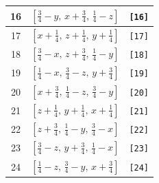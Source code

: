 \documentclass[fleqn,8pt]{jsarticle}
\begin{document}
\begin{longtable}{ccc}
16 & $\left[ \frac{3}{4} - y,\, x + \frac{3}{4},\, \frac{1}{4} - z \right]$ & {\tt [16]} \\ \hline
17 & $\left[ x + \frac{1}{4},\, z + \frac{1}{4},\, y + \frac{1}{4} \right]$ & {\tt [17]} \\ \hline
18 & $\left[ \frac{3}{4} - x,\, z + \frac{3}{4},\, \frac{1}{4} - y \right]$ & {\tt [18]} \\ \hline
19 & $\left[ \frac{1}{4} - x,\, \frac{3}{4} - z,\, y + \frac{3}{4} \right]$ & {\tt [19]} \\ \hline
20 & $\left[ x + \frac{3}{4},\, \frac{1}{4} - z,\, \frac{3}{4} - y \right]$ & {\tt [20]} \\ \hline
21 & $\left[ z + \frac{1}{4},\, y + \frac{1}{4},\, x + \frac{1}{4} \right]$ & {\tt [21]} \\ \hline
22 & $\left[ z + \frac{3}{4},\, \frac{1}{4} - y,\, \frac{3}{4} - x \right]$ & {\tt [22]} \\ \hline
23 & $\left[ \frac{3}{4} - z,\, y + \frac{3}{4},\, \frac{1}{4} - x \right]$ & {\tt [23]} \\ \hline
24 & $\left[ \frac{1}{4} - z,\, \frac{3}{4} - y,\, x + \frac{3}{4} \right]$ & {\tt [24]} \\
\end{longtable}
\end{document}
